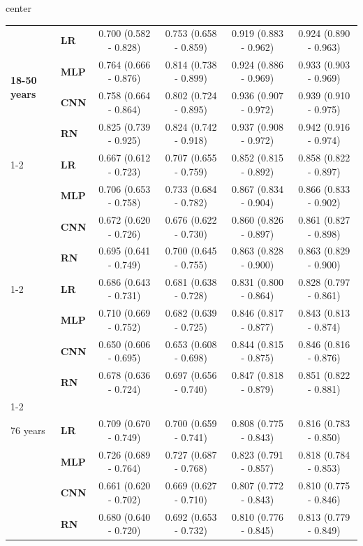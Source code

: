 \documentclass[preprint]{elsarticle}
\begin{document}
\begin{table}[H]
\begin{adjustbox}{center}
\begin{tabular}{@{}llcccc@{}}
\multirow{4}{*}{\begin{minipage}{0.65in}\textbf{18-50 years}\end{minipage}} %
& \textbf{LR} & 0.700 (0.582 - 0.828) & 0.753 (0.658 - 0.859) & 0.919 (0.883 - 0.962) & 0.924 (0.890 - 0.963) \\
& \textbf{MLP} & 0.764 (0.666 - 0.876) & 0.814 (0.738 - 0.899) & 0.924 (0.886 - 0.969) & 0.933 (0.903 - 0.969) \\
& \textbf{CNN} & 0.758 (0.664 - 0.864) & 0.802 (0.724 - 0.895) & 0.936 (0.907 - 0.972) & 0.939 (0.910 - 0.975) \\
& \textbf{RN} & 0.825 (0.739 - 0.925) & 0.824 (0.742 - 0.918) & 0.937 (0.908 - 0.972) & 0.942 (0.916 - 0.974) \\
  \cmidrule(lr){1-2}
\multirow{4}{*}{\begin{minipage}{0.65in}\textbf{51-64 years}\end{minipage}} %
& \textbf{LR} & 0.667 (0.612 - 0.723) & 0.707 (0.655 - 0.759) & 0.852 (0.815 - 0.892) & 0.858 (0.822 - 0.897) \\
& \textbf{MLP} & 0.706 (0.653 - 0.758) & 0.733 (0.684 - 0.782) & 0.867 (0.834 - 0.904) & 0.866 (0.833 - 0.902) \\
& \textbf{CNN} & 0.672 (0.620 - 0.726) & 0.676 (0.622 - 0.730) & 0.860 (0.826 - 0.897) & 0.861 (0.827 - 0.898) \\
& \textbf{RN} & 0.695 (0.641 - 0.749) & 0.700 (0.645 - 0.755) & 0.863 (0.828 - 0.900) & 0.863 (0.829 - 0.900) \\
  \cmidrule(lr){1-2}  
\multirow{4}{*}{\begin{minipage}{0.65in}\textbf{65-75 years}\end{minipage}} %
& \textbf{LR} & 0.686 (0.643 - 0.731) & 0.681 (0.638 - 0.728) & 0.831 (0.800 - 0.864) & 0.828 (0.797 - 0.861) \\
& \textbf{MLP} & 0.710 (0.669 - 0.752) & 0.682 (0.639 - 0.725) & 0.846 (0.817 - 0.877) & 0.843 (0.813 - 0.874) \\
& \textbf{CNN} & 0.650 (0.606 - 0.695) & 0.653 (0.608 - 0.698) & 0.844 (0.815 - 0.875) & 0.846 (0.816 - 0.876) \\
& \textbf{RN} & 0.678 (0.636 - 0.724) & 0.697 (0.656 - 0.740) & 0.847 (0.818 - 0.879) & 0.851 (0.822 - 0.881) \\
  \cmidrule(lr){1-2}
\multirow{4}{*}{\begin{minipage}{0.65in}\textbf{Over \\76 years}\end{minipage}} %
& \textbf{LR} & 0.709 (0.670 - 0.749) & 0.700 (0.659 - 0.741) & 0.808 (0.775 - 0.843) & 0.816 (0.783 - 0.850) \\
& \textbf{MLP} & 0.726 (0.689 - 0.764) & 0.727 (0.687 - 0.768) & 0.823 (0.791 - 0.857) & 0.818 (0.784 - 0.853) \\
& \textbf{CNN} & 0.661 (0.620 - 0.702) & 0.669 (0.627 - 0.710) & 0.807 (0.772 - 0.843) & 0.810 (0.775 - 0.846) \\
& \textbf{RN} & 0.680 (0.640 - 0.720) & 0.692 (0.653 - 0.732) & 0.810 (0.776 - 0.845) & 0.813 (0.779 - 0.849) \\


\end{tabular}
\end{adjustbox}
\end{table}
\end{document}
